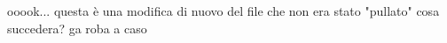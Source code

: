 \usepackage{pdfcomment}


    ooook... questa è una modifica di nuovo del file che non era stato "pullato" cosa succedera?
ga    roba a caso
    
